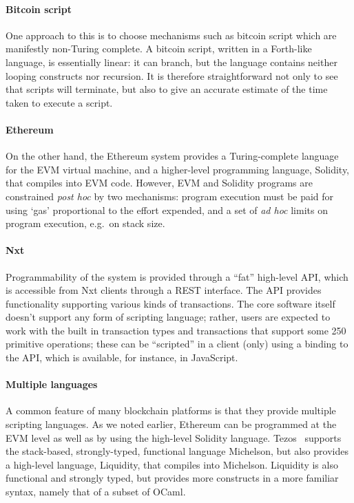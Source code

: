 \documentclass[
      acmsmall
    , screen
    , review=true
  ]{acmart}
\begin{document}
\paragraph{Bitcoin script}

One approach to this is to choose mechanisms such as bitcoin script which are manifestly non-Turing complete. A bitcoin script, written in a Forth-like language, is essentially linear: it can branch, but the language contains neither looping constructs nor recursion. It is therefore straightforward not only to see that scripts will terminate, but also to give an accurate estimate of the time taken to execute a script. 

\paragraph{Ethereum}

On the other hand, the Ethereum system provides a Turing-complete language for the EVM virtual machine, and a higher-level programming language, Solidity, that compiles into EVM code. However, EVM and Solidity programs are constrained \emph{post hoc} by two mechanisms: program execution must be paid for using `gas' proportional to the effort expended, and a set of \emph{ad hoc} limits on program execution, e.g.\ on stack size.

\paragraph{Nxt}

Programmability of the system is provided through a ``fat'' high-level API, which is accessible from Nxt clients through a REST interface. The API provides functionality supporting various kinds of transactions. The core software itself doesn't support any form of scripting language; rather, users are expected to work with the built in transaction types and transactions that support some 250 primitive operations; these can be ``scripted'' in a client (only) using a binding to the API, which is available, for instance, in JavaScript.

\paragraph{Multiple languages}

A common feature of many blockchain platforms is that they provide multiple scripting languages. As we noted earlier, Ethereum can be programmed at the EVM level as well as by using the high-level Solidity language. Tezos~\cite{tezos-white-paper} supports the stack-based, strongly-typed, functional language Michelson, but also provides a high-level language, Liquidity, that compiles into Michelson. Liquidity is also functional and strongly typed, but provides more constructs in a more familiar syntax, namely that of a subset of OCaml. 
\end{document}
